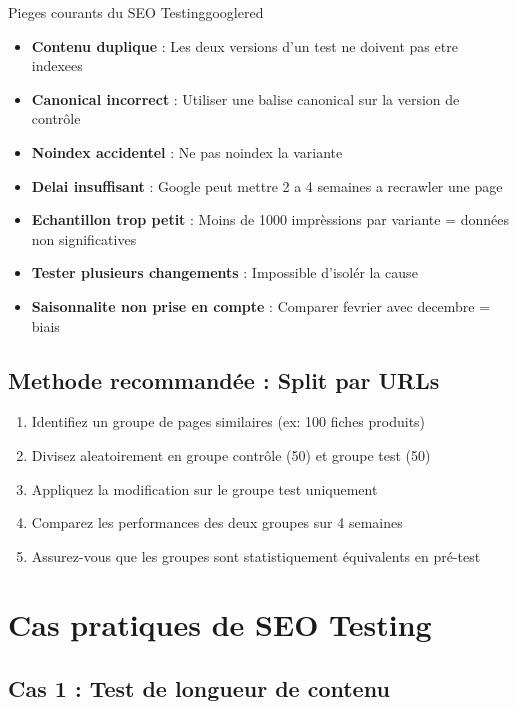 \documentclass[12pt,a4paper,twoside]{report}
\begin{document}
\begin{mybox}{Pieges courants du SEO Testing}{googlered}
\begin{itemize}
    \item \textbf{Contenu duplique} : Les deux versions d'un test ne doivent pas etre indexees
    \item \textbf{Canonical incorrect} : Utiliser une balise canonical sur la version de contrôle
    \item \textbf{Noindex accidentel} : Ne pas noindex la variante
    \item \textbf{Delai insuffisant} : Google peut mettre 2 a 4 semaines a recrawler une page
    \item \textbf{Echantillon trop petit} : Moins de 1000 imprèssions par variante = données non significatives
    \item \textbf{Tester plusieurs changements} : Impossible d'isolér la cause
    \item \textbf{Saisonnalite non prise en compte} : Comparer fevrier avec decembre = biais
\end{itemize}
\end{mybox}

\subsection{Methode recommandée : Split par URLs}

\begin{enumerate}
    \item Identifiez un groupe de pages similaires (ex: 100 fiches produits)
    \item Divisez aleatoirement en groupe contrôle (50) et groupe test (50)
    \item Appliquez la modification sur le groupe test uniquement
    \item Comparez les performances des deux groupes sur 4 semaines
    \item Assurez-vous que les groupes sont statistiquement équivalents en pré-test
\end{enumerate}

\section{Cas pratiques de SEO Testing}

\subsection{Cas 1 : Test de longueur de contenu}
\end{document}
